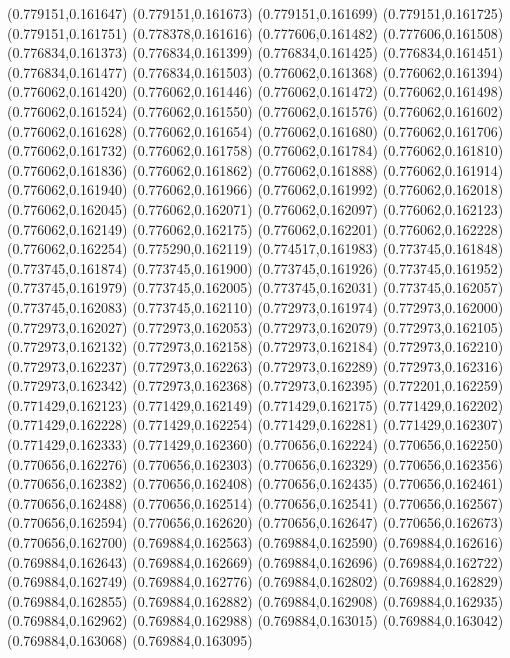 (0.779151,0.161647)
(0.779151,0.161673)
(0.779151,0.161699)
(0.779151,0.161725)
(0.779151,0.161751)
(0.778378,0.161616)
(0.777606,0.161482)
(0.777606,0.161508)
(0.776834,0.161373)
(0.776834,0.161399)
(0.776834,0.161425)
(0.776834,0.161451)
(0.776834,0.161477)
(0.776834,0.161503)
(0.776062,0.161368)
(0.776062,0.161394)
(0.776062,0.161420)
(0.776062,0.161446)
(0.776062,0.161472)
(0.776062,0.161498)
(0.776062,0.161524)
(0.776062,0.161550)
(0.776062,0.161576)
(0.776062,0.161602)
(0.776062,0.161628)
(0.776062,0.161654)
(0.776062,0.161680)
(0.776062,0.161706)
(0.776062,0.161732)
(0.776062,0.161758)
(0.776062,0.161784)
(0.776062,0.161810)
(0.776062,0.161836)
(0.776062,0.161862)
(0.776062,0.161888)
(0.776062,0.161914)
(0.776062,0.161940)
(0.776062,0.161966)
(0.776062,0.161992)
(0.776062,0.162018)
(0.776062,0.162045)
(0.776062,0.162071)
(0.776062,0.162097)
(0.776062,0.162123)
(0.776062,0.162149)
(0.776062,0.162175)
(0.776062,0.162201)
(0.776062,0.162228)
(0.776062,0.162254)
(0.775290,0.162119)
(0.774517,0.161983)
(0.773745,0.161848)
(0.773745,0.161874)
(0.773745,0.161900)
(0.773745,0.161926)
(0.773745,0.161952)
(0.773745,0.161979)
(0.773745,0.162005)
(0.773745,0.162031)
(0.773745,0.162057)
(0.773745,0.162083)
(0.773745,0.162110)
(0.772973,0.161974)
(0.772973,0.162000)
(0.772973,0.162027)
(0.772973,0.162053)
(0.772973,0.162079)
(0.772973,0.162105)
(0.772973,0.162132)
(0.772973,0.162158)
(0.772973,0.162184)
(0.772973,0.162210)
(0.772973,0.162237)
(0.772973,0.162263)
(0.772973,0.162289)
(0.772973,0.162316)
(0.772973,0.162342)
(0.772973,0.162368)
(0.772973,0.162395)
(0.772201,0.162259)
(0.771429,0.162123)
(0.771429,0.162149)
(0.771429,0.162175)
(0.771429,0.162202)
(0.771429,0.162228)
(0.771429,0.162254)
(0.771429,0.162281)
(0.771429,0.162307)
(0.771429,0.162333)
(0.771429,0.162360)
(0.770656,0.162224)
(0.770656,0.162250)
(0.770656,0.162276)
(0.770656,0.162303)
(0.770656,0.162329)
(0.770656,0.162356)
(0.770656,0.162382)
(0.770656,0.162408)
(0.770656,0.162435)
(0.770656,0.162461)
(0.770656,0.162488)
(0.770656,0.162514)
(0.770656,0.162541)
(0.770656,0.162567)
(0.770656,0.162594)
(0.770656,0.162620)
(0.770656,0.162647)
(0.770656,0.162673)
(0.770656,0.162700)
(0.769884,0.162563)
(0.769884,0.162590)
(0.769884,0.162616)
(0.769884,0.162643)
(0.769884,0.162669)
(0.769884,0.162696)
(0.769884,0.162722)
(0.769884,0.162749)
(0.769884,0.162776)
(0.769884,0.162802)
(0.769884,0.162829)
(0.769884,0.162855)
(0.769884,0.162882)
(0.769884,0.162908)
(0.769884,0.162935)
(0.769884,0.162962)
(0.769884,0.162988)
(0.769884,0.163015)
(0.769884,0.163042)
(0.769884,0.163068)
(0.769884,0.163095)
